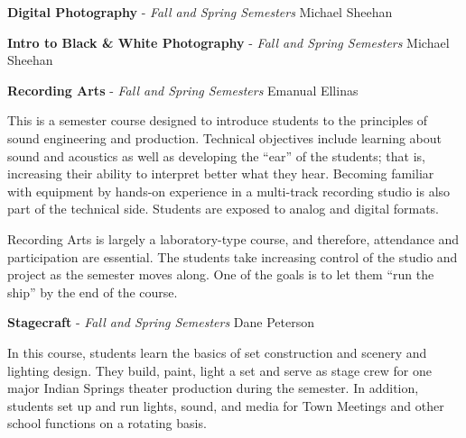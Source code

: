 \noindent\textbf{Digital Photography} - \emph{Fall and Spring Semesters} \hfill Michael Sheehan



{\small }

\vfill

\noindent\textbf{Intro to Black \& White Photography} - \emph{Fall and Spring Semesters} \hfill Michael Sheehan



{\small }

\vfill

\noindent\textbf{Recording Arts} - \emph{Fall and Spring Semesters} \hfill Emanual Ellinas



{\small This is a semester course designed to introduce students to the principles of sound engineering and production. Technical objectives include learning about sound and acoustics as well as developing the ``ear'' of the students; that is, increasing their ability to interpret better what they hear. Becoming familiar with equipment by hands-on experience in a multi-track recording studio is also part of the technical side. Students are exposed to analog and digital formats.


Recording Arts is largely a laboratory-type course, and therefore, attendance and participation are essential. The students take increasing control of the studio and project as the semester moves along. One of the goals is to let them ``run the ship'' by the end of the course.}

\vfill


\noindent\textbf{Stagecraft} - \emph{Fall and Spring Semesters} \hfill Dane Peterson



{\small In this course, students learn the basics of set construction and scenery and lighting design. They build, paint, light a set and serve as stage crew for one major Indian Springs theater production during the semester. In addition, students set up and run lights, sound, and media for Town Meetings and other school functions on a rotating basis.}

\vfill

